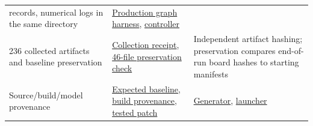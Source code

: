 \documentclass[10pt,a4paper]{article}
\begin{document}
\begin{longtable}[]{@{}lll@{}}
\begin{minipage}[t]{0.30\columnwidth}
{records}, numerical logs in the same directory\strut
\end{minipage} & \begin{minipage}[t]{0.30\columnwidth}\raggedright
\href{https://github.com/MoyaMryia/riscv-accl/blob/main/spacemit/bench/test-k1-gemm-routing.cpp}{Production
graph harness},
\href{https://github.com/MoyaMryia/riscv-accl/blob/main/spacemit/bench/k1-gemm-routing.py}{controller}\strut
\end{minipage}\tabularnewline
\begin{minipage}[t]{0.30\columnwidth}\raggedright
236 collected artifacts and baseline preservation\strut
\end{minipage} & \begin{minipage}[t]{0.30\columnwidth}\raggedright
\href{https://github.com/MoyaMryia/riscv-accl/blob/main/spacemit/reports/raw/k1-gemm-routing-20261003-005740/collection-receipt.json}{Collection
receipt},
\href{https://github.com/MoyaMryia/riscv-accl/blob/main/spacemit/reports/raw/k1-gemm-routing-20261003-005740/baseline-preservation-check.json}{46-file
preservation check}\strut
\end{minipage} & \begin{minipage}[t]{0.30\columnwidth}\raggedright
Independent artifact hashing; preservation compares end-of-run board
hashes to starting manifests\strut
\end{minipage}\tabularnewline
\begin{minipage}[t]{0.30\columnwidth}\raggedright
Source/build/model provenance\strut
\end{minipage} & \begin{minipage}[t]{0.30\columnwidth}\raggedright
\href{https://github.com/MoyaMryia/riscv-accl/blob/main/spacemit/reports/raw/k1-gemm-routing-20261003-005740/expected-provenance.json}{Expected
baseline},
\href{https://github.com/MoyaMryia/riscv-accl/blob/main/spacemit/reports/raw/k1-gemm-routing-20261003-005740/provenance.json}{build
provenance},
\href{https://github.com/MoyaMryia/riscv-accl/blob/main/spacemit/reports/raw/k1-gemm-routing-20261003-005740/candidate-gemm-routing.patch}{tested
patch}\strut
\end{minipage} & \begin{minipage}[t]{0.30\columnwidth}\raggedright
\href{https://github.com/MoyaMryia/riscv-accl/blob/main/spacemit/bench/make-k1-gemm-routing.py}{Generator},
\href{https://github.com/MoyaMryia/riscv-accl/blob/main/spacemit/bench/start-k1-gemm-routing.py}{launcher}\strut
\end{minipage}\tabularnewline

\end{longtable}
\end{document}
